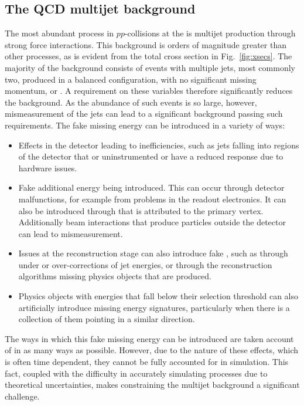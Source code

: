 \subsection{The QCD multijet background}
\label{sec:qcdMultijet}

The most abundant \SM process in $pp$-collisions at the \LHC is \QCD
multijet production through strong force interactions. This background
is orders of magnitude greater than other processes, as is evident
from the total \LHC cross section in Fig.~\ref{fig:xsecs}. The
majority of the \QCD background consists of events with multiple jets,
most commonly two, produced in a balanced configuration, with no
significant missing momentum, \MET or \MHT. A requirement on these
variables therefore significantly reduces the background. As
the abundance of such events is so large, however, mismeasurement of
the jets can lead to a significant \QCD background passing such
requirements. The fake missing energy can be introduced in a variety
of ways:
\begin{itemize}
\item{Effects in the detector leading to inefficiencies, such as jets
falling into regions of the detector that or uninstrumented or have a
reduced response due to hardware issues.}
\item{Fake additional energy being introduced. This can occur through
detector malfunctions, for example from problems in the readout
electronics. It can also be introduced through \PU that is attributed to
the primary vertex. Additionally beam interactions that produce
particles outside the detector can lead to mismeasurement.}
\item{Issues at the reconstruction stage can also introduce fake \MET,
such as through under or over-corrections of jet energies, or through
the reconstruction algorithms missing physics objects that are
produced.}
\item{Physics objects with energies that fall below their selection
threshold can also artificially introduce missing energy signatures,
particularly when there is a collection of them pointing in a similar
direction.}
\end{itemize}

The ways in which this fake missing energy can be introduced are
taken account of in as many ways as possible. However, due to the
nature of these effects, which is often time dependent, they cannot be
fully accounted for in simulation. This fact, coupled with the
difficulty in accurately simulating \QCD processes due to theoretical
uncertainties, makes constraining the multijet background a significant
challenge. 

